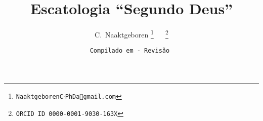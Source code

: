 \makeatletter
\immediate{}
\immediate{}
\makeatother
\title{\textbf{Escatologia ``Segundo Deus''}}
\author{%
    C.~Naaktgeboren%
        \thanks{\tt NaaktgeborenC$\cdot$PhD\textcircled{a}gmail.com}%
    ~~%
        \thanks{\tt ORCID ID 0000-0001-9030-163X}%
}
\date{{\scriptsize\texttt{Compilado em  - Revisão }}}
